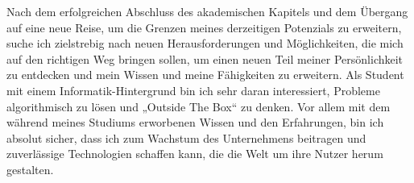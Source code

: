 Nach dem erfolgreichen Abschluss des akademischen Kapitels und dem Übergang auf eine neue Reise, um die Grenzen meines derzeitigen Potenzials zu erweitern, suche ich zielstrebig nach neuen Herausforderungen und Möglichkeiten, die mich auf den richtigen Weg bringen sollen, um einen neuen Teil meiner Persönlichkeit zu entdecken und mein Wissen und meine Fähigkeiten zu erweitern. Als Student mit einem Informatik-Hintergrund bin ich sehr daran interessiert, Probleme algorithmisch zu lösen und „Outside The Box“ zu denken. Vor allem mit dem während meines Studiums erworbenen Wissen und den Erfahrungen, bin ich absolut sicher, dass ich zum Wachstum des Unternehmens beitragen und zuverlässige Technologien schaffen kann, die die Welt um ihre Nutzer herum gestalten.

